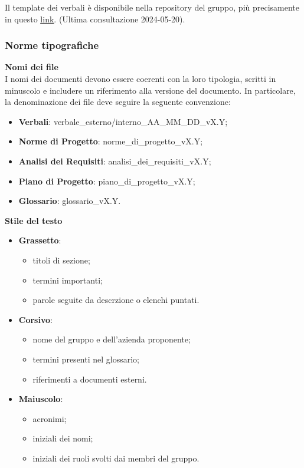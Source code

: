 Il template dei verbali è disponibile nella repository del gruppo, più precisamente in questo \href{https://github.com/7Last/docs/tree/develop/0_template}{\underline{link}}. (Ultima consultazione 2024-05-20).
\newpage
\subsubsection{Norme tipografiche}
\textbf{Nomi dei file}\\ I nomi dei documenti devono essere coerenti con la loro tipologia, scritti in minuscolo e includere un riferimento alla versione del documento. In particolare, la denominazione dei file deve seguire la seguente convenzione:
\begin{itemize}
	\item \textbf{Verbali}: verbale\_esterno/interno\_AA\_MM\_DD\_vX.Y;
	\item \textbf{Norme di Progetto}: norme\_di\_progetto\_vX.Y;
	\item \textbf{Analisi dei Requisiti}: analisi\_dei\_requisiti\_vX.Y;
	\item \textbf{Piano di Progetto}: piano\_di\_progetto\_vX.Y;
	\item \textbf{Glossario}: glossario\_vX.Y.
\end{itemize}
\textbf{Stile del testo}
\begin{itemize}
	\item \textbf{Grassetto}:
	      \begin{itemize}
		      \item titoli di sezione;
		      \item termini importanti;
		      \item parole seguite da descrzione o elenchi puntati.
	      \end{itemize}
	\item \textbf{Corsivo}:
	      \begin{itemize}
		      \item nome del gruppo e dell'azienda proponente;
		      \item termini presenti nel glossario;
		      \item riferimenti a documenti esterni.
	      \end{itemize}
	\item \textbf{Maiuscolo}:
	      \begin{itemize}
		      \item acronimi;
		      \item iniziali dei nomi;
		      \item iniziali dei ruoli svolti dai membri del gruppo.
	      \end{itemize}
\end{itemize}

